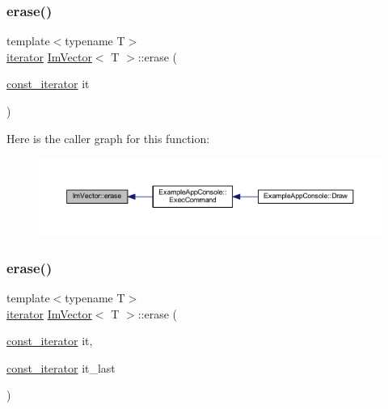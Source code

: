 \subsubsection{\texorpdfstring{erase()}{erase()}\hspace{0.1cm}{\footnotesize\ttfamily [1/2]}}
{\footnotesize\ttfamily template$<$typename T$>$ \\
\mbox{\hyperlink{class_im_vector_a74b5478f1f6fd471cc71219bce483db6}{iterator}} \mbox{\hyperlink{class_im_vector}{Im\+Vector}}$<$ T $>$\+::erase (\begin{DoxyParamCaption}\item[{\mbox{\hyperlink{class_im_vector_aedeac9c5080f9d6ce96ae837768ee4c4}{const\+\_\+iterator}}}]{it }\end{DoxyParamCaption})\hspace{0.3cm}{\ttfamily [inline]}}

Here is the caller graph for this function\+:
\nopagebreak
\begin{figure}[H]
\begin{center}
\leavevmode
\includegraphics[width=350pt]{class_im_vector_a1e1fd9b678be9d4b4432fbefde976045_icgraph}
\end{center}
\end{figure}
\mbox{\label{class_im_vector_a908dd550be687acdbeadcf0500374276}} 
\subsubsection{\texorpdfstring{erase()}{erase()}\hspace{0.1cm}{\footnotesize\ttfamily [2/2]}}
{\footnotesize\ttfamily template$<$typename T$>$ \\
\mbox{\hyperlink{class_im_vector_a74b5478f1f6fd471cc71219bce483db6}{iterator}} \mbox{\hyperlink{class_im_vector}{Im\+Vector}}$<$ T $>$\+::erase (\begin{DoxyParamCaption}\item[{\mbox{\hyperlink{class_im_vector_aedeac9c5080f9d6ce96ae837768ee4c4}{const\+\_\+iterator}}}]{it,  }\item[{\mbox{\hyperlink{class_im_vector_aedeac9c5080f9d6ce96ae837768ee4c4}{const\+\_\+iterator}}}]{it\+\_\+last }\end{DoxyParamCaption})\hspace{0.3cm}{\ttfamily [inline]}}

